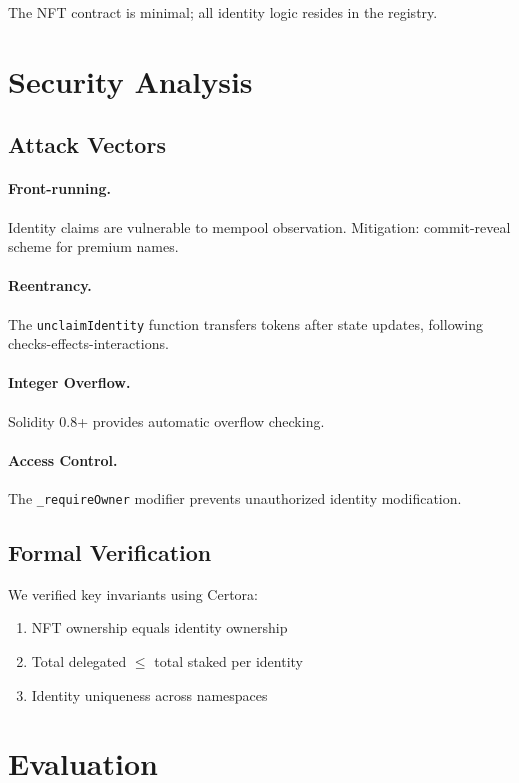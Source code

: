\documentclass[11pt,twocolumn]{article}
\begin{document}
The NFT contract is minimal; all identity logic resides in the registry.

\section{Security Analysis}

\subsection{Attack Vectors}

\paragraph{Front-running.} Identity claims are vulnerable to mempool observation. Mitigation: commit-reveal scheme for premium names.

\paragraph{Reentrancy.} The \texttt{unclaimIdentity} function transfers tokens after state updates, following checks-effects-interactions.

\paragraph{Integer Overflow.} Solidity 0.8+ provides automatic overflow checking.

\paragraph{Access Control.} The \texttt{\_requireOwner} modifier prevents unauthorized identity modification.

\subsection{Formal Verification}

We verified key invariants using Certora:
\begin{enumerate}
    \item NFT ownership equals identity ownership
    \item Total delegated $\leq$ total staked per identity
    \item Identity uniqueness across namespaces
\end{enumerate}

\section{Evaluation}
\end{document}
